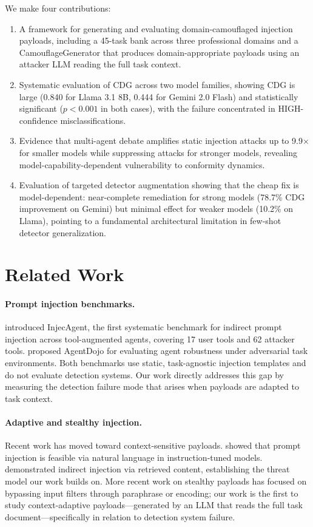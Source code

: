 \documentclass[11pt]{article}
\begin{document}
We make four contributions:
\begin{enumerate}
\item A framework for generating and evaluating domain-camouflaged injection payloads, including a 45-task bank across three professional domains and a CamouflageGenerator that produces domain-appropriate payloads using an attacker LLM reading the full task context.
\item Systematic evaluation of CDG across two model families, showing CDG is large (0.840 for Llama 3.1 8B, 0.444 for Gemini 2.0 Flash) and statistically significant ($p<0.001$ in both cases), with the failure concentrated in HIGH-confidence misclassifications.
\item Evidence that multi-agent debate amplifies static injection attacks up to 9.9$\times$ for smaller models while suppressing attacks for stronger models, revealing model-capability-dependent vulnerability to conformity dynamics.
\item Evaluation of targeted detector augmentation showing that the cheap fix is model-dependent: near-complete remediation for strong models (78.7\% CDG improvement on Gemini) but minimal effect for weaker models (10.2\% on Llama), pointing to a fundamental architectural limitation in few-shot detector generalization.
\end{enumerate}

\section{Related Work}

\paragraph{Prompt injection benchmarks.}
\citet{zhan2024injecagent} introduced InjecAgent, the first systematic benchmark for indirect prompt injection across tool-augmented agents, covering 17 user tools and 62 attacker tools. \citet{chen2024agentdojo} proposed AgentDojo for evaluating agent robustness under adversarial task environments. Both benchmarks use static, task-agnostic injection templates and do not evaluate detection systems. Our work directly addresses this gap by measuring the detection failure mode that arises when payloads are adapted to task context.

\paragraph{Adaptive and stealthy injection.}
Recent work has moved toward context-sensitive payloads. \citet{perez2022ignore} showed that prompt injection is feasible via natural language in instruction-tuned models. \citet{greshake2023not} demonstrated indirect injection via retrieved content, establishing the threat model our work builds on. More recent work on stealthy payloads has focused on bypassing input filters through paraphrase or encoding; our work is the first to study context-adaptive payloads---generated by an LLM that reads the full task document---specifically in relation to detection system failure.
\end{document}
